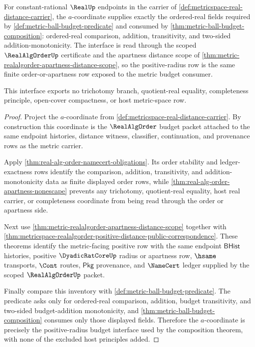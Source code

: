 \begin{theorem}
\label{thm:metricspace-realalgorder-positive-radius-budget-interface}
For constant-rational $\RealUp$ endpoints in the carrier of
\autoref{def:metricspace-real-distance-carrier}, the $a$-coordinate supplies
exactly the ordered-real fields required by
\autoref{def:metric-ball-budget-predicate} and consumed by
\autoref{thm:metric-ball-budget-composition}: ordered-real comparison,
addition, transitivity, and two-sided addition-monotonicity. The interface is
read through the scoped $\RealAlgOrderUp$ certificate and the apartness distance
scope of \autoref{thm:metric-realalgorder-apartness-distance-scope}, so the
positive-radius row is the same finite order-or-apartness row exposed to the
metric budget consumer.

This interface exports no trichotomy branch, quotient-real equality,
completeness principle, open-cover compactness, or host metric-space row.
\end{theorem}
\begin{proof}
Project the $a$-coordinate from
\autoref{def:metricspace-real-distance-carrier}. By construction this
coordinate is the $\RealAlgOrder$ budget packet attached to the same endpoint
histories, distance witness, classifier, continuation, and provenance rows as
the metric carrier.

Apply \autoref{thm:real-alg-order-namecert-obligations}. Its order stability
and ledger-exactness rows identify the comparison, addition, transitivity, and
addition-monotonicity data as finite displayed order rows, while
\autoref{thm:real-alg-order-apartness-nonescape} prevents any trichotomy,
quotient-real equality, host real carrier, or completeness coordinate from
being read through the order or apartness side.

Next use \autoref{thm:metric-realalgorder-apartness-distance-scope} together
with
\autoref{thm:metricspace-realalgorder-positive-distance-public-correspondence}.
These theorems identify the metric-facing positive row with the same endpoint
$\mathsf{BHist}$ histories, positive $\DyadicRatCoreUp$ radius or apartness
row, $\hsame$ transports, $\Cont$ routes, $\mathsf{Pkg}$ provenance, and
$\NameCert$ ledger supplied by the scoped $\RealAlgOrderUp$ packet.

Finally compare this inventory with
\autoref{def:metric-ball-budget-predicate}. The predicate asks only for
ordered-real comparison, addition, budget transitivity, and two-sided
budget-addition monotonicity, and
\autoref{thm:metric-ball-budget-composition} consumes only those displayed
fields. Therefore the $a$-coordinate is precisely the positive-radius budget
interface used by the composition theorem, with none of the excluded host
principles added.
\end{proof}

